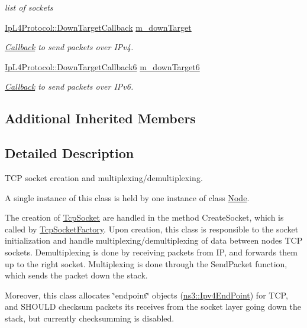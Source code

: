 \begin{DoxyCompactItemize}
\begin{DoxyCompactList}\small\item\em list of sockets \end{DoxyCompactList}\item 
\hyperlink{classns3_1_1IpL4Protocol_ae3ba76c0a48fbaa90529c528a15f12b6}{Ip\+L4\+Protocol\+::\+Down\+Target\+Callback} \hyperlink{classns3_1_1TcpL4Protocol_a6624133b0d5072cacbd77c9dc90aee75}{m\+\_\+down\+Target}
\begin{DoxyCompactList}\small\item\em \hyperlink{classns3_1_1Callback}{Callback} to send packets over I\+Pv4. \end{DoxyCompactList}\item 
\hyperlink{classns3_1_1IpL4Protocol_a039f3d1883632ab922fa958fc9ecd97f}{Ip\+L4\+Protocol\+::\+Down\+Target\+Callback6} \hyperlink{classns3_1_1TcpL4Protocol_ae4447ef1e9b58f1352b819a9c6fff496}{m\+\_\+down\+Target6}
\begin{DoxyCompactList}\small\item\em \hyperlink{classns3_1_1Callback}{Callback} to send packets over I\+Pv6. \end{DoxyCompactList}\end{DoxyCompactItemize}
\subsection*{Additional Inherited Members}


\subsection{Detailed Description}
T\+CP socket creation and multiplexing/demultiplexing. 

A single instance of this class is held by one instance of class \hyperlink{classns3_1_1Node}{Node}.

The creation of \hyperlink{classns3_1_1TcpSocket}{Tcp\+Socket} are handled in the method Create\+Socket, which is called by \hyperlink{classns3_1_1TcpSocketFactory}{Tcp\+Socket\+Factory}. Upon creation, this class is responsible to the socket initialization and handle multiplexing/demultiplexing of data between node\textquotesingle{}s T\+CP sockets. Demultiplexing is done by receiving packets from IP, and forwards them up to the right socket. Multiplexing is done through the Send\+Packet function, which sends the packet down the stack.

Moreover, this class allocates \char`\"{}endpoint\char`\"{} objects (\hyperlink{classns3_1_1Ipv4EndPoint}{ns3\+::\+Ipv4\+End\+Point}) for T\+CP, and S\+H\+O\+U\+LD checksum packets its receives from the socket layer going down the stack, but currently checksumming is disabled.

